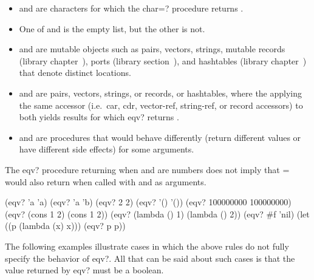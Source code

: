 \begin{entry}{%
}
\begin{itemize}
\item {} and  are characters for which the {\cf char=?}
  procedure returns \schfalse{}.

\item One of  and  is the empty list, but the other is not.

\item {} and  are mutable objects such as pairs,
  vectors, strings, mutable records (library
  chapter~), ports (library
  section~), and hashtables (library
  chapter~) that denote
  distinct locations.

\item {} and  are pairs, vectors, strings, or
  records, or hashtables, where the applying the same accessor (i.e.\
  {\cf car}, {\cf cdr}, {\cf vector-ref}, {\cf string-ref}, or record
  accessors) to both yields results for which {\cf eqv?} returns
  \schfalse.

\item {} and  are procedures that would behave differently
(return different values or have different side effects) for some arguments.

\end{itemize}

\begin{note}
  The {\cf eqv?} procedure returning \schtrue{} when  and
   are numbers does not imply that {\cf =} would also
  return \schtrue{} when called with \vari{obj} and \varii{obj} as
  arguments.
\end{note}


\begin{scheme}
(eqv? 'a 'a)                     \ev  \schtrue
(eqv? 'a 'b)                     \ev  \schfalse
(eqv? 2 2)                       \ev  \schtrue
(eqv? '() '())                   \ev  \schtrue
(eqv? 100000000 100000000)       \ev  \schtrue
(eqv? (cons 1 2) (cons 1 2))     \ev  \schfalse
(eqv? (lambda () 1)
      (lambda () 2))             \ev  \schfalse
(eqv? \#f 'nil)                  \ev  \schfalse
(let ((p (lambda (x) x)))
  (eqv? p p))                    \ev  \unspecified%
\end{scheme}

The following examples illustrate cases in which the above rules do
not fully specify the behavior of {\cf eqv?}.  All that can be said
about such cases is that the value returned by {\cf eqv?} must be a
boolean.


\end{entry}
